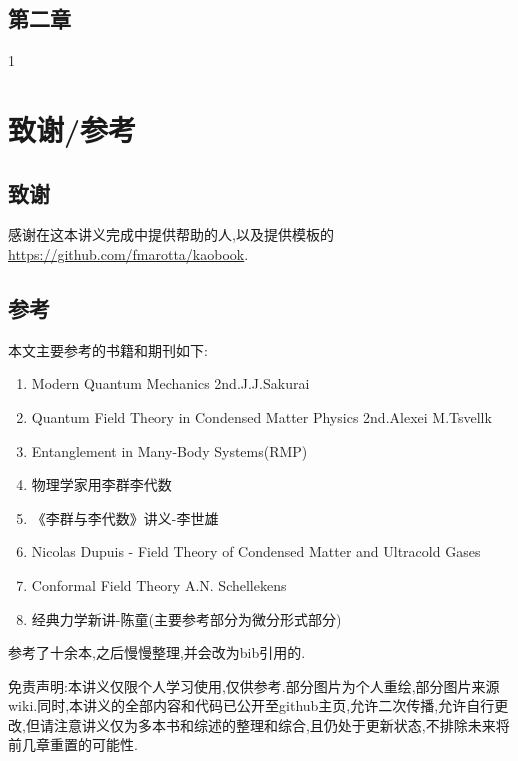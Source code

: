 \section{第二章}
1
\chapter{致谢/参考}
\section{致谢}
感谢在这本讲义完成中提供帮助的人,以及提供模板的\href{https://github.com/fmarotta/kaobook}{https://github.com/fmarotta/kaobook}.

\section{参考}
本文主要参考的书籍和期刊如下:
\begin{enumerate}
    \item Modern Quantum Mechanics 2nd.J.J.Sakurai
    \item Quantum Field Theory in Condensed Matter Physics 2nd.Alexei M.Tsvellk
    \item Entanglement in Many-Body Systems(RMP)
    \item 物理学家用李群李代数
    \item 《李群与李代数》讲义-李世雄
    \item Nicolas Dupuis - Field Theory of Condensed Matter and Ultracold Gases
    \item Conformal Field Theory A.N. Schellekens
    \item 经典力学新讲-陈童(主要参考部分为微分形式部分)
\end{enumerate}
参考了十余本,之后慢慢整理,并会改为bib引用的.

免责声明:本讲义仅限个人学习使用,仅供参考.部分图片为个人重绘,部分图片来源wiki.同时,本讲义的全部内容和代码已公开至github主页,允许二次传播,允许自行更改,但请注意讲义仅为多本书和综述的整理和综合,且仍处于更新状态,不排除未来将前几章重置的可能性.

















